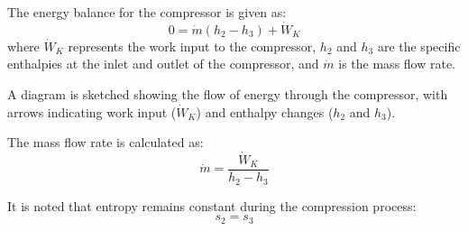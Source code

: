 The energy balance for the compressor is given as:  
\[
0 = \dot{m} (h_2 - h_3) + \dot{W}_K
\]  
where \( \dot{W}_K \) represents the work input to the compressor, \( h_2 \) and \( h_3 \) are the specific enthalpies at the inlet and outlet of the compressor, and \( \dot{m} \) is the mass flow rate.  

A diagram is sketched showing the flow of energy through the compressor, with arrows indicating work input (\( \dot{W}_K \)) and enthalpy changes (\( h_2 \) and \( h_3 \)).  

The mass flow rate is calculated as:  
\[
\dot{m} = \frac{\dot{W}_K}{h_2 - h_3}
\]  

It is noted that entropy remains constant during the compression process:  
\[
s_2 = s_3
\]